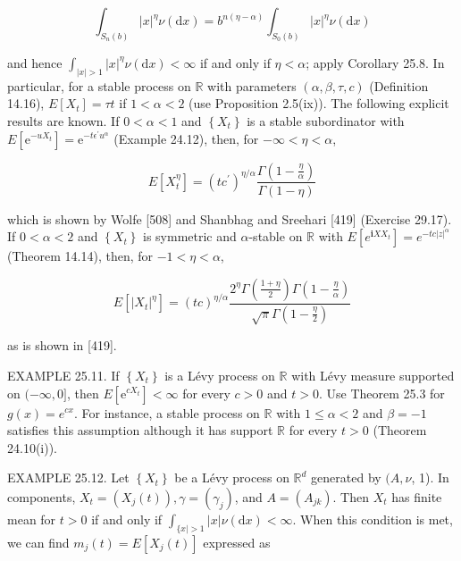 \documentclass[a4paper,12pt]{article}
\begin{document}
$$
    \int_{S_{n}(b)}|x|^{\eta} \nu(\mathrm{d} x)=b^{n(\eta-\alpha)} \int_{S_{0}(b)}|x|^{\eta} \nu(\mathrm{d} x)
$$

and hence $\int_{|x|>1}|x|^{\eta} \nu(\mathrm{d} x)<\infty$ if and only if $\eta<\alpha$; apply Corollary 25.8. In particular, for a stable process on $\mathbb{R}$ with parameters $(\alpha, \beta, \tau, c)$ (Definition 14.16), $E\left[X_{t}\right]=\tau t$ if $1<\alpha<2$ (use Proposition 2.5(ix)). The following explicit results are known. If $0<\alpha<1$ and $\left\{X_{t}\right\}$ is a stable subordinator with $E\left[\mathrm{e}^{-u X_{t}}\right]=\mathrm{e}^{-t \epsilon^{\prime} u^{\alpha}}$ (Example 24.12), then, for $-\infty<\eta<\alpha$,


\begin{equation*}
    E\left[X_{t}^{\eta}\right]=\left(t c^{\prime}\right)^{\eta / \alpha} \frac{\Gamma\left(1-\frac{\eta}{\alpha}\right)}{\Gamma(1-\eta)} \tag{25.5}
\end{equation*}


which is shown by Wolfe [508] and Shanbhag and Sreehari [419] (Exercise 29.17). If $0<\alpha<2$ and $\left\{X_{t}\right\}$ is symmetric and $\alpha$-stable on $\mathbb{R}$ with $E\left[e^{\mathbf{i} X X_{t}}\right]=e^{-t c|z|^{\alpha}}$ (Theorem 14.14), then, for $-1<\eta<\alpha$,


\begin{equation*}
    E\left[\left|X_{t}\right|^{\eta}\right]=(t c)^{\eta / \alpha} \frac{2^{\eta} \Gamma\left(\frac{1+\eta}{2}\right) \Gamma\left(1-\frac{\eta}{\alpha}\right)}{\sqrt{\pi} \Gamma\left(1-\frac{\eta}{2}\right)} \tag{25.6}
\end{equation*}


as is shown in [419].

EXAMPLE 25.11. If $\left\{X_{t}\right\}$ is a Lévy process on $\mathbb{R}$ with Lévy measure supported on $(-\infty, 0]$, then $E\left[\mathrm{e}^{c X_{t}}\right]<\infty$ for every $c>0$ and $t>0$. Use Theorem 25.3 for $g(x)=e^{c x}$. For instance, a stable process on $\mathbb{R}$ with $1 \leq \alpha<2$ and $\beta=-1$ satisfies this assumption although it has support $\mathbb{R}$ for every $t>0$ (Theorem 24.10(i)).

EXAMPLE 25.12. Let $\left\{X_{t}\right\}$ be a Lévy process on $\mathbb{R}^{d}$ generated by $(A, \nu$, 1). In components, $X_{t}=\left(X_{j}(t)\right), \gamma=\left(\gamma_{j}\right)$, and $A=\left(A_{j k}\right)$. Then $X_{t}$ has finite mean for $t>0$ if and only if $\int_{\{x \mid>1}|x| \nu(\mathrm{d} x)<\infty$. When this condition is met, we can find $m_{j}(t)=E\left[X_{j}(t)\right]$ expressed as
\end{document}
